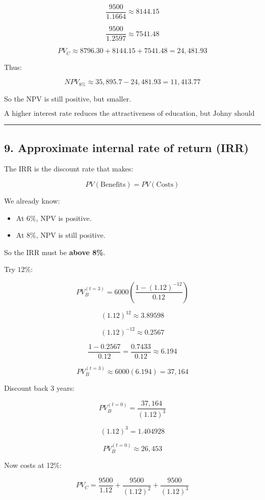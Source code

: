 \documentclass[12pt]{article}
\begin{document}
\[
\frac{9500}{1.1664} \approx 8144.15
\]

\[
\frac{9500}{1.2597} \approx 7541.48
\]

\[
PV_C \approx 8796.30 + 8144.15 + 7541.48 = 24{,}481.93
\]

Thus:

\[
NPV_{8\%} \approx 35{,}895.7 - 24{,}481.93 = 11{,}413.77
\]

So the NPV is still positive, but smaller.

\[
\boxed{\text{A higher interest rate reduces the attractiveness of education, but Johny should still invest.}}
\]

\hrule
\vspace{0.5em}

\subsection*{9. Approximate internal rate of return (IRR)}

The IRR is the discount rate that makes:

\[
PV(\text{Benefits}) = PV(\text{Costs})
\]

We already know:

\begin{itemize}
    \item At \(6\%\), NPV is positive.
    \item At \(8\%\), NPV is still positive.
\end{itemize}

So the IRR must be \textbf{above 8\%}.

Try \(12\%\):

\[
PV_B^{(t=3)} = 6000\left(\frac{1-(1.12)^{-12}}{0.12}\right)
\]

\[
(1.12)^{12} \approx 3.89598
\]

\[
(1.12)^{-12} \approx 0.2567
\]

\[
\frac{1-0.2567}{0.12} = \frac{0.7433}{0.12} \approx 6.194
\]

\[
PV_B^{(t=3)} \approx 6000(6.194)=37{,}164
\]

Discount back 3 years:

\[
PV_B^{(t=0)} = \frac{37{,}164}{(1.12)^3}
\]

\[
(1.12)^3 = 1.404928
\]

\[
PV_B^{(t=0)} \approx 26{,}453
\]

Now costs at 12\%:

\[
PV_C = \frac{9500}{1.12} + \frac{9500}{(1.12)^2} + \frac{9500}{(1.12)^3}
\]
\end{document}
